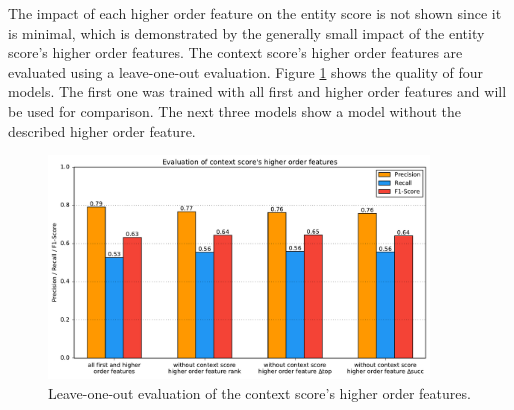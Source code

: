 The impact of each higher order feature on the entity score is not shown since it is minimal, which is demonstrated by the generally small impact of the entity score's higher order features. The context score's higher order features are evaluated using a leave-one-out evaluation. Figure \ref{ho_eval_context} shows the quality of four models. The first one was trained with all first and higher order features and will be used for comparison. The next three models show a model without the described higher order feature.\par
\begin{figure}[H]
	\centering
	\includegraphics[width=0.9\textwidth]{img/higher_order_eval_context}
	\caption{Leave-one-out evaluation of the context score's higher order features.}
	\label{ho_eval_context}
\end{figure}
